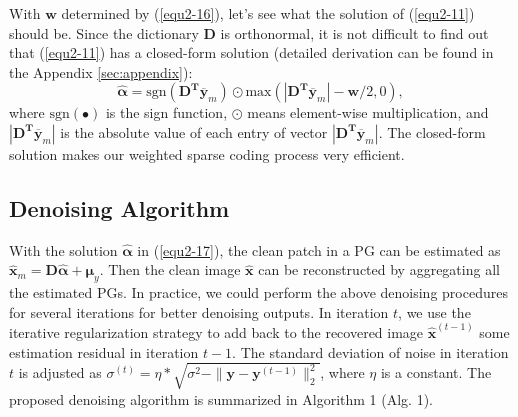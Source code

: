 With $\bm{w}$ determined by (\ref{equ2-16}), let's see what the solution of (\ref{equ2-11}) should be. Since the dictionary $\bm{D}$ is orthonormal, it is not difficult to find out that (\ref{equ2-11}) has a closed-form solution (detailed derivation can be found in the Appendix \ref{sec:appendix}):
\begin{equation}\label{equ2-17}
\hat{\bm{\alpha}}= \text{sgn}(\bm{D^{T}\overline{y}}_{m})\odot \text{max}(|\bm{D^{T}\overline{y}}_{m}|-\bm{w}/2,0),
\end{equation}
where $\text{sgn}(\bullet)$ is the sign function, $\odot$ means element-wise multiplication, and $|\bm{D^{T}\overline{y}}_{m}|$ is the absolute value of each entry of vector $|\bm{D^{T}\overline{y}}_{m}|$. The closed-form solution makes our weighted sparse coding process very efficient. 
\subsection{Denoising Algorithm}
With the solution $\hat{\bm{\alpha}}$ in (\ref{equ2-17}), the clean patch in a PG can be estimated as $\hat{\bm{x}}_{m}=\bm{D}\hat{\bm{\alpha}}+\bm{\mu}_{y}$. Then the clean image $\hat{\bm{x}}$ can be reconstructed by aggregating all the estimated PGs. In practice, we could perform the above denoising procedures for several iterations for better denoising outputs. In iteration $t$, we use the iterative regularization strategy \cite{osher2005iterative} to add back to the recovered image $\hat{\bm{x}}^{(t-1)}$ some estimation residual in iteration $t-1$. The standard deviation of noise in iteration $t$ is adjusted as $\sigma^{(t)} = \eta*\sqrt{\sigma^{2}-\|\bm{y}-\bm{y}^{(t-1)}\|_{2}^{2}}$, where $\eta$ is a constant. The proposed denoising algorithm is summarized in Algorithm 1 (Alg. 1).

